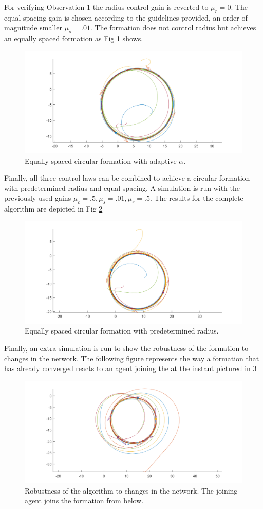 For verifying Observation 1 the radius control gain is reverted to $\mu_r=0$. The equal spacing gain is chosen according to the guidelines provided, an order of magnitude smaller $\mu_s=.01$. The formation does not control radius but achieves an equally spaced formation as Fig  \ref{fig:EquallySpaced} shows.
\begin{figure}
	\includegraphics[width=\linewidth]{Attachments/Figure42.png}
	\caption{Equally spaced circular formation with adaptive $\alpha$.}
	\label{fig:EquallySpaced}
\end{figure}

Finally, all three control laws can be combined to achieve a circular formation with predetermined radius and equal spacing. A simulation is run with the previously used gains $\mu_c=.5,\mu_s=.01,\mu_r=.5$. The results for the complete algorithm are depicted in Fig \ref{fig:FormationConvergence}
\begin{figure}
	\includegraphics[width=\linewidth]{Attachments/Figure44.png}
	\caption{Equally spaced circular formation with predetermined radius.}
	\label{fig:FormationConvergence}
\end{figure}

Finally, an extra simulation is run to show the robustness of the formation to changes in the network. The following figure represents the way a formation that has already converged reacts to an agent joining the at the instant pictured in \ref{fig:Robustness}

\begin{figure}
	\includegraphics[width=\linewidth]{Attachments/Figure45.png}
	\caption{Robustness of the algorithm to changes in the network. The joining agent joins the formation from below.}
	\label{fig:Robustness}
\end{figure}